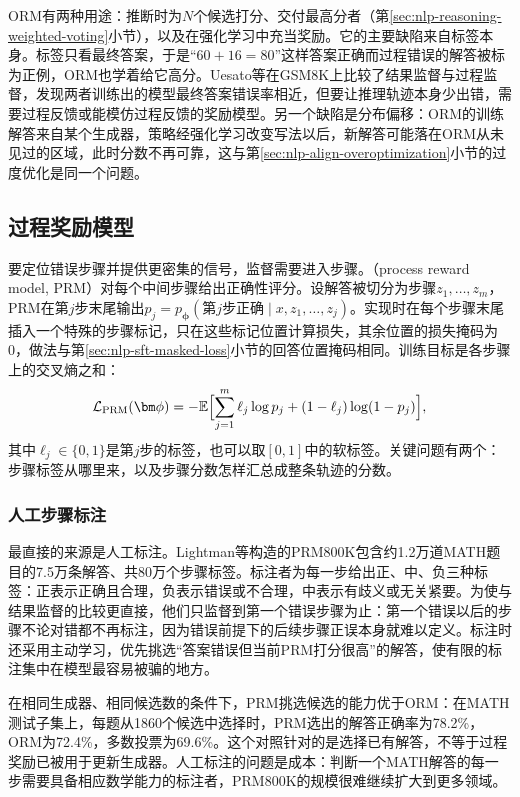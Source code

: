 ORM有两种用途：推断时为$N$个候选打分、交付最高分者（第\ref{sec:nlp-reasoning-weighted-voting}小节），以及在强化学习中充当奖励。它的主要缺陷来自标签本身。标签只看最终答案，于是“$60+16=80$”这样答案正确而过程错误的解答被标为正例，ORM也学着给它高分。Uesato等在GSM8K上比较了结果监督与过程监督，发现两者训练出的模型最终答案错误率相近，但要让推理轨迹本身少出错，需要过程反馈或能模仿过程反馈的奖励模型。另一个缺陷是分布偏移：ORM的训练解答来自某个生成器，策略经强化学习改变写法以后，新解答可能落在ORM从未见过的区域，此时分数不再可靠，这与第\ref{sec:nlp-align-overoptimization}小节的过度优化是同一个问题。

\subsection{过程奖励模型}
\label{sec:nlp-reasoning-prm}

要定位错误步骤并提供更密集的信号，监督需要进入步骤。（process reward model, PRM）对每个中间步骤给出正确性评分。设解答被切分为步骤$z_1,\ldots,z_m$，PRM在第$j$步末尾输出$p_j=p_{\bm\phi}(\text{第}j\text{步正确}\mid x,z_1,\ldots,z_j)$。实现时在每个步骤末尾插入一个特殊的步骤标记，只在这些标记位置计算损失，其余位置的损失掩码为0，做法与第\ref{sec:nlp-sft-masked-loss}小节的回答位置掩码相同。训练目标是各步骤上的交叉熵之和：
\begin{equation}
  \mathcal L_{\mathrm{PRM}}(\bm\phi)
  =-\mathbb E\Bigl[\sum_{j=1}^{m}\ell_j\log p_j+(1-\ell_j)\log(1-p_j)\Bigr],
  \label{eq:nlp-reasoning-prm}
\end{equation}
其中$\ell_j\in\{0,1\}$是第$j$步的标签，也可以取$[0,1]$中的软标签。关键问题有两个：步骤标签从哪里来，以及步骤分数怎样汇总成整条轨迹的分数。

\subsubsection{人工步骤标注}
\label{sec:nlp-reasoning-prm-human}

最直接的来源是人工标注。Lightman等构造的PRM800K包含约1.2万道MATH题目的7.5万条解答、共80万个步骤标签。标注者为每一步给出正、中、负三种标签：正表示正确且合理，负表示错误或不合理，中表示有歧义或无关紧要。为使与结果监督的比较更直接，他们只监督到第一个错误步骤为止：第一个错误以后的步骤不论对错都不再标注，因为错误前提下的后续步骤正误本身就难以定义。标注时还采用主动学习，优先挑选“答案错误但当前PRM打分很高”的解答，使有限的标注集中在模型最容易被骗的地方。

在相同生成器、相同候选数的条件下，PRM挑选候选的能力优于ORM：在MATH测试子集上，每题从1860个候选中选择时，PRM选出的解答正确率为78.2\%，ORM为72.4\%，多数投票为69.6\%。这个对照针对的是选择已有解答，不等于过程奖励已被用于更新生成器。人工标注的问题是成本：判断一个MATH解答的每一步需要具备相应数学能力的标注者，PRM800K的规模很难继续扩大到更多领域。

